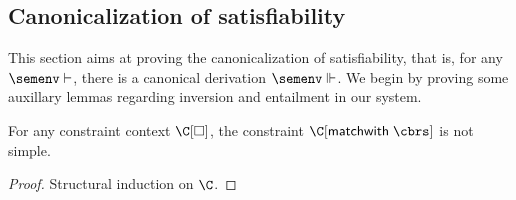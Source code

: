 \documentclass[acmsmall,screen,nonacm,review]{acmart}
\begin{document}
\subsection{Canonicalization of satisfiability}

This section aims at proving the canonicalization of satisfiability, that is,
for any $\semenv \th \c$, there is a canonical derivation $\semenv \Th \c$.
%
We begin by proving some auxillary lemmas regarding inversion and
entailment in our system.

\begin{lemma}
  \label{lem:match-is-not-simple}
  For any constraint context $\C\where{\square}$,
  the constraint $\C\where{\cmatch \t \cbrs}$ is not simple.
  \begin{proof}
    Structural induction on $\C$.
  \end{proof}
\end{lemma}
\end{document}
